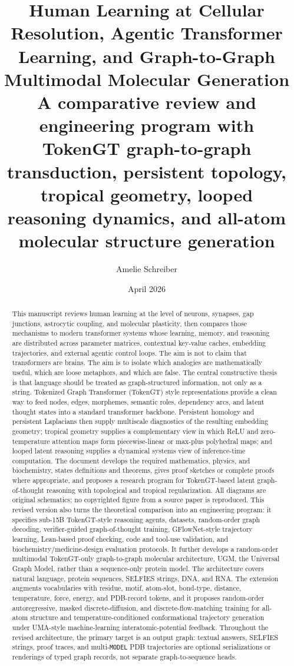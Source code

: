 \documentclass[11pt]{article}
\title{\vspace{-0.5in}\textbf{Human Learning at Cellular Resolution, Agentic Transformer Learning, and Graph-to-Graph Multimodal Molecular Generation}\\[0.3em]
\large A comparative review and engineering program with TokenGT graph-to-graph transduction, persistent topology, tropical geometry, looped reasoning dynamics, and all-atom molecular structure generation}
\author{Amelie Schreiber}
\date{April 2026}
\newcommand{\1}{\mathbf{1}}
\newcommand{\UGM}{\textsc{UGM}}
\begin{document}
\maketitle

\begin{abstract}
This manuscript reviews human learning at the level of neurons, synapses, gap junctions, astrocytic coupling, and molecular plasticity, then compares those mechanisms to modern transformer systems whose learning, memory, and reasoning are distributed across parameter matrices, contextual key-value caches, embedding trajectories, and external agentic control loops. The aim is not to claim that transformers are brains. The aim is to isolate which analogies are mathematically useful, which are loose metaphors, and which are false. The central constructive thesis is that language should be treated as graph-structured information, not only as a string. Tokenized Graph Transformer (TokenGT) style representations provide a clean way to feed nodes, edges, morphemes, semantic roles, dependency arcs, and latent thought states into a standard transformer backbone. Persistent homology and persistent Laplacians then supply multiscale diagnostics of the resulting embedding geometry; tropical geometry supplies a complementary view in which ReLU and zero-temperature attention maps form piecewise-linear or max-plus polyhedral maps; and looped latent reasoning supplies a dynamical systems view of inference-time computation. The document develops the required mathematics, physics, and biochemistry, states definitions and theorems, gives proof sketches or complete proofs where appropriate, and proposes a research program for TokenGT-based latent graph-of-thought reasoning with topological and tropical regularization. All diagrams are original schematics; no copyrighted figure from a source paper is reproduced. This revised version also turns the theoretical comparison into an engineering program: it specifies sub-15B TokenGT-style reasoning agents, datasets, random-order graph decoding, verifier-guided graph-of-thought training, GFlowNet-style trajectory learning, Lean-based proof checking, code and tool-use validation, and biochemistry/medicine-design evaluation protocols. It further develops a random-order multimodal TokenGT-only graph-to-graph molecular architecture, \UGM, the Universal Graph Model, rather than a sequence-only protein model. The architecture covers natural language, protein sequences, SELFIES strings, DNA, and RNA. The extension augments vocabularies with residue, motif, atom-slot, bond-type, distance, temperature, force, energy, and PDB-record tokens, and it proposes random-order autoregressive, masked discrete-diffusion, and discrete-flow-matching training for all-atom structure and temperature-conditioned conformational trajectory generation under UMA-style machine-learning interatomic-potential feedback. Throughout the revised architecture, the primary target is an output graph: textual answers, SELFIES strings, proof traces, and multi-\texttt{MODEL} PDB trajectories are optional serializations or renderings of typed graph records, not separate graph-to-sequence heads.
\end{abstract}
\end{document}
